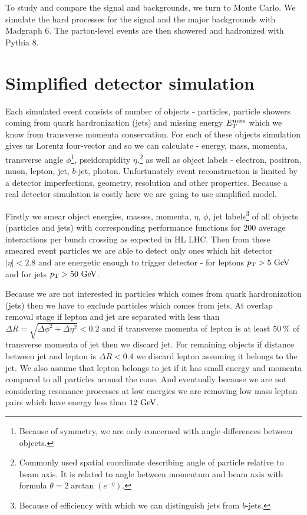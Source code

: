 \documentclass[tightenline,notitlepage,nofootinbib]{revtex4-1}
\begin{document}
To study and compare the signal and backgrounds, we turn to Monte Carlo. We simulate the hard processes for the signal and the major backgrounds with Madgraph 6. The parton-level events are then showered and hadronized with Pythia 8. 

\section{Simplified detector simulation}

Each simulated event consists of number of objects - particles, particle showers coming from quark hardronization (jets) and missing energy $E^{\rm{miss}}_T$ which we know from transverse momenta conservation. For each of these objects simulation gives us Lorentz four-vector and so we can calculate - energy, mass, momenta, transverse angle $\phi$\footnote{Because of symmetry, we are only concerned with angle differences between objects.}, pseidorapidity $\eta$.\footnote{Commonly used spatial coordinate describing angle of particle relative to beam axis. It is related to angle between momentum and beam axis with formula $\theta=2 \arctan (e^{-\eta})$.} as well as object labels - electron, positron, muon, lepton, jet, $b$-jet, photon. Unfortunately event reconstruction is limited by a detector imperfections, geometry, resolution and other properties. Because a real detector simulation is costly here we are going to use simplified model.

Firstly we smear object energies, masses, momenta, $\eta$, $\phi$, jet labels\footnote{Because of efficiency with which we can distinguish jets from $b$-jets.} of all objects (particles and jets) with corresponding performance functions for $200$ average interactions per bunch crossing as expected in HL LHC. Then from these smeared event particles we are able to detect only ones which hit detector $|\eta|<2.8$ and are energetic enough to trigger detector - for leptons  $p_{\rm{T}} > 5~\rm{GeV} $ and for jets $p_{\rm T}>50~\rm{GeV}$.

Because we are not interested in particles which comes from quark hardronization (jets) then we have to exclude particles which comes from jets. At overlap removal stage if lepton and jet are separated with less than $\Delta R = \sqrt{\Delta \phi^2 + \Delta \eta^2}<0.2$ and if transverse momenta of lepton is at least $50~ \%$ of transverse momenta of jet then we discard jet. For remaining objects if distance between jet and lepton is $\Delta R < 0.4$ we discard lepton assuming it belongs to the jet. We also assume that lepton belongs to jet if it has small energy and momenta compared to all particles around the cone. And eventually because we are not considering resonance processes at low energies we are removing low mass lepton pairs which have energy less than $12 ~\rm{GeV}$.
\end{document}
